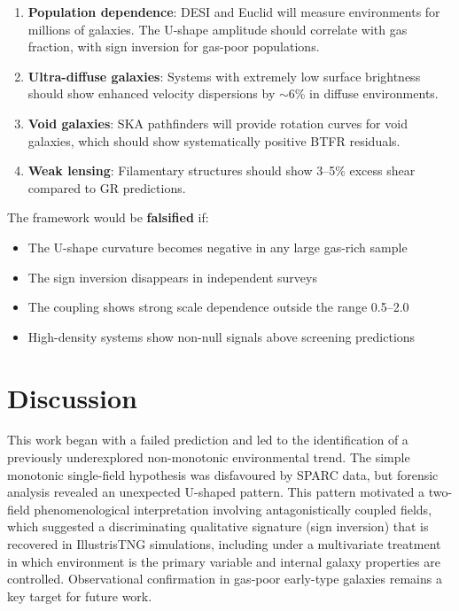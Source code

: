 \documentclass[11pt,a4paper]{article}
\begin{document}
\begin{enumerate}
\item \textbf{Population dependence}: DESI and Euclid will measure environments for millions of galaxies. The U-shape amplitude should correlate with gas fraction, with sign inversion for gas-poor populations.

\item \textbf{Ultra-diffuse galaxies}: Systems with extremely low surface brightness should show enhanced velocity dispersions by $\sim$6\% in diffuse environments.

\item \textbf{Void galaxies}: SKA pathfinders will provide rotation curves for void galaxies, which should show systematically positive BTFR residuals.

\item \textbf{Weak lensing}: Filamentary structures should show 3--5\% excess shear compared to GR predictions.
\end{enumerate}

The framework would be \textbf{falsified} if:
\begin{itemize}
\item The U-shape curvature becomes negative in any large gas-rich sample
\item The sign inversion disappears in independent surveys
\item The coupling shows strong scale dependence outside the range 0.5--2.0
\item High-density systems show non-null signals above screening predictions
\end{itemize}


\section*{Discussion}

This work began with a failed prediction and led to the identification of a previously underexplored non-monotonic environmental trend. The simple monotonic single-field hypothesis was disfavoured by SPARC data, but forensic analysis revealed an unexpected U-shaped pattern. This pattern motivated a two-field phenomenological interpretation involving antagonistically coupled fields, which suggested a discriminating qualitative signature (sign inversion) that is recovered in IllustrisTNG simulations, including under a multivariate treatment in which environment is the primary variable and internal galaxy properties are controlled. Observational confirmation in gas-poor early-type galaxies remains a key target for future work.
\end{document}
